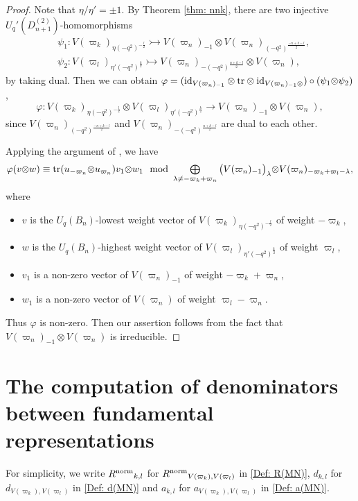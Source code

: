 \documentclass[11pt, leqno]{amsart}
\theoremstyle{definition}
\numberwithin{equation}{section}
\begin{document}
\begin{proof}
Note that $\eta/\eta' = \pm 1$. By Theorem \ref{thm: nnk}, there are two injective $U_q'(D^{(2)}_{n+1})$-homomorphisms
\begin{align*}
&  \psi_1\colon  V(\varpi_{k})_{\eta{(-q^2)}^{-\frac{l}{2}}}
  \rightarrowtail V(\varpi_{n})_{-1} \otimes V(\varpi_{n})_{{(-q^2)}^{\frac{-n+k-l}{2}}}, \\[1ex]
&   \psi_2\colon V(\varpi_{l})_{\eta'{(-q^2)}^{\frac{k}{2}}}
   \rightarrowtail V(\varpi_{n})_{-{(-q^2)}^{\frac{n+k-l}{2}}}\otimes V(\varpi_{n}),
\end{align*}
by taking dual. Then we can obtain
$\varphi= ({\rm id}_{V(\varpi_{n})_{-1}} \otimes {\rm tr} \otimes {\rm id}_{V(\varpi_{n})_{-1} \otimes}) \circ(\psi_1{\mathop\otimes} \psi_2)$,
$$ \varphi: V(\varpi_{k})_{\eta{(-q^2)}^{-\frac{l}{2}}} \otimes V(\varpi_{l})_{\eta'{(-q^2)}^{\frac{k}{2}}}
\longrightarrow V(\varpi_{n})_{-1} \otimes V(\varpi_{n}),$$
since $V(\varpi_{n})_{{(-q^2)}^{\frac{-n+k-l}{2}}}$ and $V(\varpi_{n})_{-{(-q^2)}^{\frac{n+k-l}{2}}}$ are dual to each other.

Applying the argument of \cite[Lemma A.3.2]{KKK13b}, we have
$$\varphi(v{\mathop\otimes} w)
\equiv{\rm tr}(u_{-{\varpi}_{n}}{\mathop\otimes} u_{{\varpi}_{n}})v_1{\mathop\otimes} w_1 \mod
{\mathop{\mbox{\normalsize$\bigoplus$}}\limits}_{\lambda\not= -{\varpi}_k +{\varpi}_{n}}\big(V({\varpi}_n)_{-1}\big)_\lambda{\mathop\otimes}
V({\varpi}_n)_{-{\varpi}_k+{\varpi}_l-\lambda},$$
where
\begin{itemize}
\item $v$ is the $U_q(B_n)$-lowest weight vector of $V({\varpi}_k)_{\eta{(-q^2)}^{-\frac{l}{2}}}$ of weight $-{\varpi}_k$,
\item $w$ is the $U_q(B_n)$-highest weight vector of $V({\varpi}_l)_{\eta'{(-q^2)}^{\frac{k}{2}}}$ of weight ${\varpi}_l$,
\item $v_1$ is a non-zero vector of $V({\varpi}_n)_{-1}$ of weight $-{\varpi}_k+{\varpi}_{n}$,
\item $w_1$ is a non-zero vector of $V({\varpi}_n)$ of weight ${\varpi}_l-{\varpi}_{n}$.
\end{itemize}
Thus $\varphi$ is non-zero. Then our assertion follows from the fact that $V({\varpi}_n)_{-1}{\mathop\otimes} V({\varpi}_n)$ is irreducible.
\end{proof}

\section{The computation of denominators between fundamental representations}
For simplicity, we write ${R^{\rm{norm}}}_{k,l}$ for ${R^{\rm{norm}}}_{V({\varpi}_k),V({\varpi}_l)}$ in \eqref{Def: R(MN)}, $d_{k,l}$ for $d_{V({\varpi}_k),V({\varpi}_l)}$ in \eqref{Def: d(MN)}
and  $a_{k,l}$ for $a_{V({\varpi}_k),V({\varpi}_l)}$ in \eqref{Def: a(MN)}.
\end{document}
